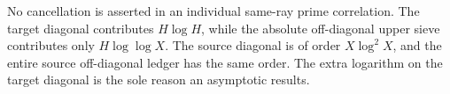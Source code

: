 \begin{remark}
No cancellation is asserted in an individual same-ray prime correlation.
The target diagonal contributes $H\log H$, while the absolute
off-diagonal upper sieve contributes only $H\log\log X$.  The source
diagonal is of order $X\log^2X$, and the entire source off-diagonal ledger
has the same order.  The extra logarithm on the target diagonal is the
sole reason an asymptotic results.
\end{remark}
